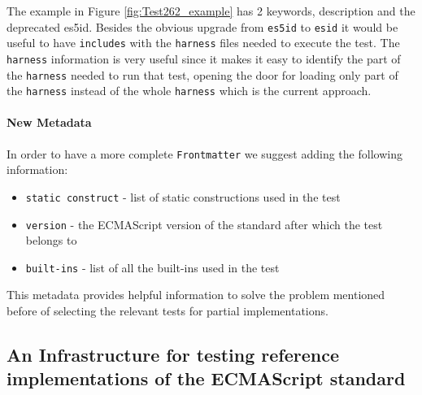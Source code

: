 \documentclass[runningheads]{llncs}
\begin{document}








The example in Figure \ref{fig:Test262_example} has 2 keywords, description and the deprecated es5id. Besides the obvious upgrade from \texttt{es5id} to \texttt{esid} it would be useful to have \texttt{includes} with the \texttt{harness} files needed to execute the test. The \texttt{harness} information is very useful since it makes it easy to identify the part of the \texttt{harness} needed to run that test, opening the door for loading only part of the \texttt{harness} instead of the whole \texttt{harness} which is the current approach.



\paragraph{New Metadata}
In order to have a more complete \texttt{Frontmatter} we suggest adding the following information:

\begin{itemize}
    \item \texttt{static construct} - list of static constructions used in the test
    \item \texttt{version} - the ECMAScript version of the standard after which the test belongs to
    \item \texttt{built-ins} - list of all the built-ins used in the test
\end{itemize}

This metadata provides helpful information to solve the problem mentioned before of selecting the relevant tests for partial implementations. 

\subsection{An Infrastructure for testing reference implementations of the ECMAScript standard}
\label{subsec:An Infrastructure for testing reference implementations of the ECMAScript standard}
\end{document}
